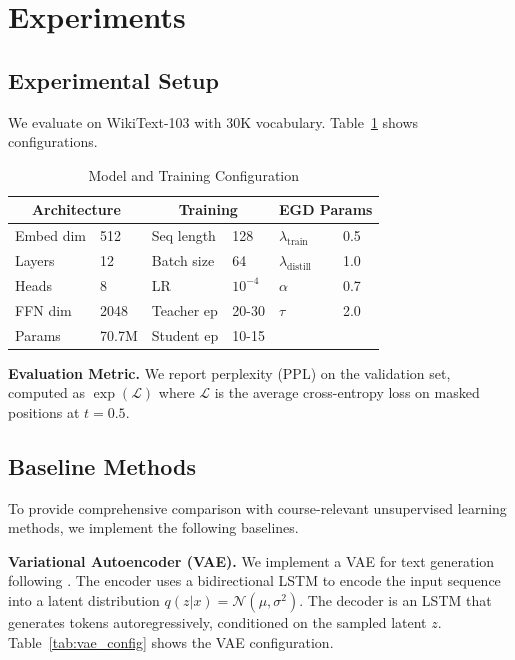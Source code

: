 \documentclass[conference]{IEEEtran}
\begin{document}
\section{Experiments}
\label{sec:experiments}

\subsection{Experimental Setup}
We evaluate on WikiText-103 \cite{merity2017pointer} with 30K vocabulary. Table~\ref{tab:config} shows configurations.

\begin{table}[h]
\centering
\caption{Model and Training Configuration}
\label{tab:config}
\small
\begin{tabular}{ll|ll|ll}
\toprule
\multicolumn{2}{c|}{\textbf{Architecture}} & \multicolumn{2}{c|}{\textbf{Training}} & \multicolumn{2}{c}{\textbf{EGD Params}} \\
\midrule
Embed dim & 512 & Seq length & 128 & $\lambda_{\text{train}}$ & 0.5 \\
Layers & 12 & Batch size & 64 & $\lambda_{\text{distill}}$ & 1.0 \\
Heads & 8 & LR & $10^{-4}$ & $\alpha$ & 0.7 \\
FFN dim & 2048 & Teacher ep & 20-30 & $\tau$ & 2.0 \\
Params & 70.7M & Student ep & 10-15 & & \\
\bottomrule
\end{tabular}
\end{table}


\textbf{Evaluation Metric.} We report perplexity (PPL) on the validation set, computed as $\exp(\mathcal{L})$ where $\mathcal{L}$ is the average cross-entropy loss on masked positions at $t=0.5$.

\subsection{Baseline Methods}

To provide comprehensive comparison with course-relevant unsupervised learning methods, we implement the following baselines.

\textbf{Variational Autoencoder (VAE).} We implement a VAE for text generation following \cite{bowman2016generating}. The encoder uses a bidirectional LSTM to encode the input sequence into a latent distribution $q(z|x) = \mathcal{N}(\mu, \sigma^2)$. The decoder is an LSTM that generates tokens autoregressively, conditioned on the sampled latent $z$. Table~\ref{tab:vae_config} shows the VAE configuration.
\end{document}
